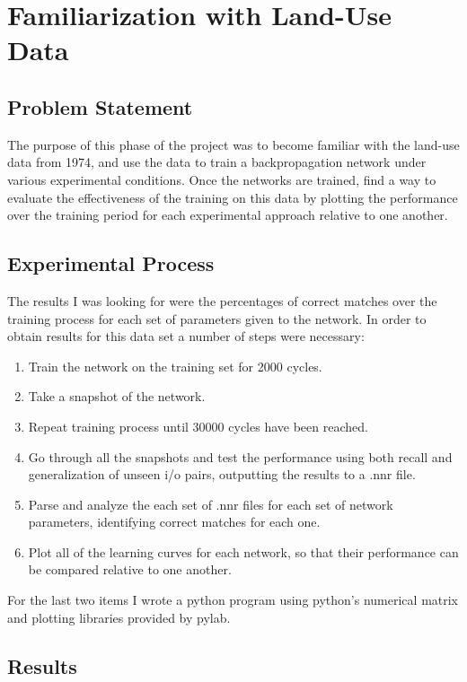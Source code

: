 \documentclass[12pt]{article}
\begin{document}
\maketitle

\section{Familiarization with Land-Use Data}

\subsection{Problem Statement}

The purpose of this phase of the project was to become familiar with the land-use data from 1974, and use the data to train a backpropagation network under various experimental conditions.  Once the networks are trained, find a way to evaluate the effectiveness of the training on this data by plotting the performance over the training period for each experimental approach relative to one another.

\subsection{Experimental Process}

The results I was looking for were the percentages of correct matches over the training process for each set of parameters given to the network.  In order to obtain results for this data set a number of steps were necessary:

\begin{enumerate}
\item Train the network on the training set for 2000 cycles.
\item Take a snapshot of the network.
\item Repeat training process until 30000 cycles have been reached.
\item Go through all the snapshots and test the performance using both recall and generalization of unseen i/o pairs, outputting the results to a .nnr file.
\item Parse and analyze the each set of .nnr files for each set of network parameters, identifying correct matches for each one.
\item Plot all of the learning curves for each network, so that their performance can be compared relative to one another.
\end{enumerate}

For the last two items I wrote a python program using python's numerical matrix and plotting libraries provided by pylab.  

\subsection{Results}
\end{document}
